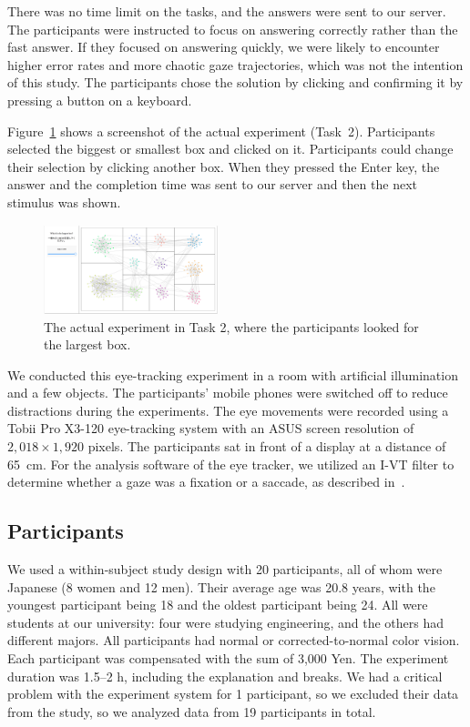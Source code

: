 \documentclass[review]{vgtc}                 %
\begin{document}
There was no time limit on the tasks, and the answers were sent to our server.
The participants were instructed to focus on answering correctly rather than the fast answer.
If they focused on answering quickly, we were likely to encounter higher error rates and more chaotic gaze trajectories, which was not the intention of this study.
The participants chose the solution by clicking and confirming it by pressing a button on a keyboard.

Figure~\ref{screenShot} shows a screenshot of the actual experiment (Task~2). Participants selected the biggest or smallest box and clicked on it. Participants could change their selection by clicking another box. When they pressed the Enter key, the answer and the completion time was sent to our server and then the next stimulus was shown.

\begin{figure}[h]
  \begin{center}
    \includegraphics[width=0.45\textwidth]{pictures/screenshot.png}
    \caption{The actual experiment in Task 2, where the participants looked for the largest box.}
    \label{screenShot}
  \end{center}
\end{figure}

We conducted this eye-tracking experiment in a room with artificial illumination and a few objects.
The participants' mobile phones were switched off to reduce distractions during the experiments.
The eye movements were recorded using a Tobii Pro X3-120 eye-tracking system with an ASUS screen resolution of $2,018 \times 1,920$ pixels.
The participants sat in front of a display at a distance of 65~cm.
For the analysis software of the eye tracker, we utilized an I-VT filter to determine whether a gaze was a fixation or a saccade, as described in~\cite{olsen2012tobii}.

\subsection{Participants}

We used a within-subject study design with 20 participants, all of whom were Japanese (8 women and 12 men).
Their average age was 20.8 years, with the youngest participant being 18 and the oldest participant being 24.
All were students at our university: four were studying engineering, and the others had different majors.
All participants had normal or corrected-to-normal color vision.
Each participant was compensated with the sum of 3,000 Yen.
The experiment duration was 1.5--2 h, including the explanation and breaks.
We had a critical problem with the experiment system for 1 participant, so we excluded their data from the study, so we analyzed data from 19 participants in total.
\end{document}
